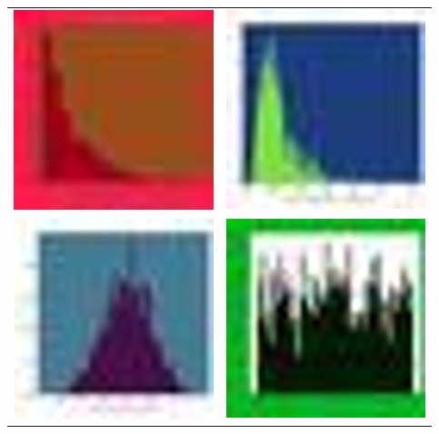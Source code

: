 \documentclass[12pt]{article}
\begin{document}
            \begin{table}
                \begin{center}
                
                    \begin{tabular}{ c  c }

                        \includegraphics[scale=0.74]{mis-as-nat-exp-20.jpg} & \includegraphics[scale=0.74]{mis-as-nat-lognorm-544.jpg} \\
                
                        \includegraphics[scale=0.74]{mis-as-nat-norm-695.jpg} & \includegraphics[scale=0.74]{mis-as-nat-unif-352.jpg} \\


\end{tabular}
\end{center}
\end{table}
\end{document}
